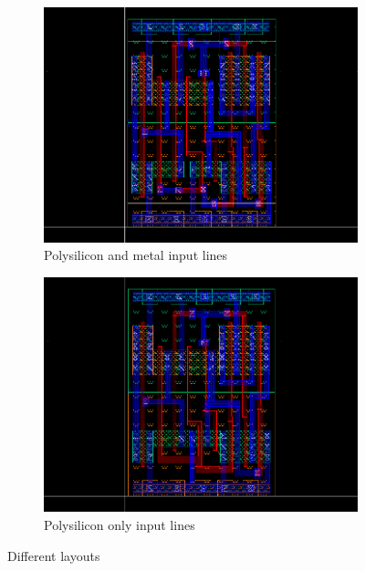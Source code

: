 \documentclass[a4paper]{article}
\begin{document}
\begin{figure}[H]
    \centering
    \begin{subfigure}[h]{0.8\textwidth}
        \centering
        \includegraphics[width=\linewidth]{./Images/HA/HAX1_poly-metal_layout.png}
        \caption{Polysilicon and metal input lines}
		\label{fig: polymetal}
    \end{subfigure}
    \begin{subfigure}[b]{0.8\textwidth}
        \centering
        \includegraphics[width=\linewidth]{./Images/HA/HAX1_poly_layout.png}
        \caption{Polysilicon only input lines}
		\label{fig:poly}
    \end{subfigure}
    \caption{Different layouts}
    \label{fig: HAX1_layouts}
\end{figure}
\end{document}
